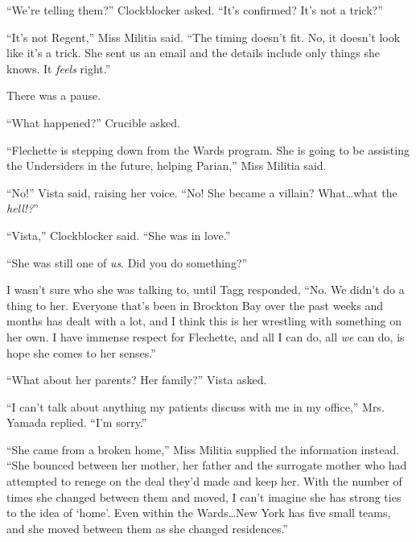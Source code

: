 ``We're telling them?'' Clockblocker asked.  ``It's confirmed?  It's not a trick?''



``It's not Regent,'' Miss Militia said.  ``The timing doesn't fit.  No, it doesn't look like it's a trick.  She sent us an email and the details include only things she knows.  It \emph{feels} right.''



There was a pause.



``What happened?'' Crucible asked.



``Flechette is stepping down from the Wards program.  She is going to be assisting the Undersiders in the future, helping Parian,'' Miss Militia said.



``No!''  Vista said, raising her voice.  ``No!  She became a villain?  What\ldots what the \emph{hell!?}''



``Vista,'' Clockblocker said.  ``She was in love.''



``She was still one of \emph{us}.  Did you do something?''



I wasn't sure who she was talking to, until Tagg responded, ``No.  We didn't do a thing to her.  Everyone that's been in Brockton Bay over the past weeks and months has dealt with a lot, and I think this is her wrestling with something on her own.  I have immense respect for Flechette, and all I can do, all \emph{we} can do, is hope she comes to her senses.''



``What about her parents?  Her family?''  Vista asked.



``I can't talk about anything my patients discuss with me in my office,'' Mrs. Yamada replied.  ``I'm sorry.''



``She came from a broken home,'' Miss Militia supplied the information instead.  ``She bounced between her mother, her father and the surrogate mother who had attempted to renege on the deal they'd made and keep her.  With the number of times she changed between them and moved, I can't imagine she has strong ties to the idea of `home'.  Even within the Wards\ldots New York has five small teams, and she moved between them as she changed residences.''



